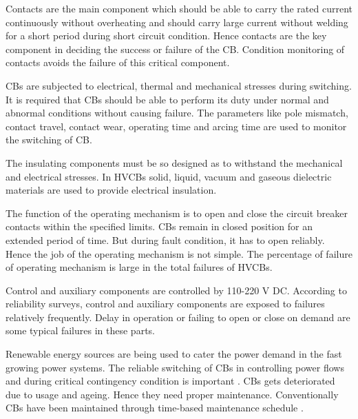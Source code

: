 \justify
\begin{description}[style=nextline, before={\setcounter{descriptcount}{0}},font=\bfseries\stepcounter{descriptcount}\thedescriptcount.~]

\item[Contacts] Contacts are the main component which should be able to carry the rated current continuously without overheating and should carry large current without welding for a short period during short circuit condition. Hence contacts are the key component in deciding the success or failure of the CB. Condition monitoring of contacts avoids the failure of this critical component.

\item[Switching] CBs are subjected to electrical, thermal and mechanical stresses during switching. It is required that CBs should be able to perform its duty under normal and abnormal conditions without causing failure. The parameters like pole mismatch, contact travel, contact wear, operating time and arcing time are used to monitor the switching of CB. 

\item[Insulation] The insulating components must be so designed as to withstand the mechanical and electrical stresses. In HVCBs solid, liquid, vacuum and gaseous dielectric materials are used to provide electrical insulation.

\item[Operating Mechanism] The function of the operating mechanism is to open and close the circuit breaker contacts within the specified limits. CBs remain in closed position for an extended period of time. But during fault condition, it has to open reliably. Hence the job of the operating mechanism is not simple. The percentage of failure of operating mechanism is large in the total failures of HVCBs.

\item[Control and auxiliary functions] Control and auxiliary components are controlled by 110-220 V DC. According to reliability surveys, control and auxiliary components are exposed to failures relatively frequently. Delay in operation or failing to open or close on demand are some typical failures in these parts.
\end{description}

\setlength{\parskip}{1em}

Renewable energy sources are being used to cater the power demand in the fast growing power systems. The reliable switching of CBs in controlling power flows and during critical contingency condition is important \cite{hedman2009optimal, kezunovic2014reliable, gu2014fast}. CBs gets deteriorated due to usage and ageing. Hence they need proper maintenance. Conventionally CBs have been maintained through time-based maintenance schedule \cite{hinow2011substation, li2004cost, razi2013priority, liu2010optimal, razi2013priorityassessment}.


